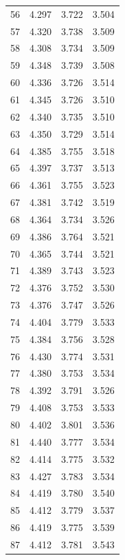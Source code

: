 \documentclass[12pt]{article}
\begin{document}
\begin{center}
\begin{tabular}{|l || l| l| l|}
            56 & 4.297 & 3.722 & 3.504 \\
            57 & 4.320 & 3.738 & 3.509 \\
            58 & 4.308 & 3.734 & 3.509 \\
            59 & 4.348 & 3.739 & 3.508 \\
            60 & 4.336 & 3.726 & 3.514 \\
            61 & 4.345 & 3.726 & 3.510 \\
            62 & 4.340 & 3.735 & 3.510 \\
            63 & 4.350 & 3.729 & 3.514 \\
            64 & 4.385 & 3.755 & 3.518 \\
            65 & 4.397 & 3.737 & 3.513 \\
            66 & 4.361 & 3.755 & 3.523 \\
            67 & 4.381 & 3.742 & 3.519 \\
            68 & 4.364 & 3.734 & 3.526 \\
            69 & 4.386 & 3.764 & 3.521 \\
            70 & 4.365 & 3.744 & 3.521 \\
            71 & 4.389 & 3.743 & 3.523 \\
            72 & 4.376 & 3.752 & 3.530 \\
            73 & 4.376 & 3.747 & 3.526 \\
            74 & 4.404 & 3.779 & 3.533 \\
            75 & 4.384 & 3.756 & 3.528 \\
            76 & 4.430 & 3.774 & 3.531 \\
            77 & 4.380 & 3.753 & 3.534 \\
            78 & 4.392 & 3.791 & 3.526 \\
            79 & 4.408 & 3.753 & 3.533 \\
            80 & 4.402 & 3.801 & 3.536 \\
            81 & 4.440 & 3.777 & 3.534 \\
            82 & 4.414 & 3.775 & 3.532 \\
            83 & 4.427 & 3.783 & 3.534 \\
            84 & 4.419 & 3.780 & 3.540 \\
            85 & 4.412 & 3.779 & 3.537 \\
            86 & 4.419 & 3.775 & 3.539 \\
            87 & 4.412 & 3.781 & 3.543 \\

\end{tabular}
\end{center}
\end{document}
